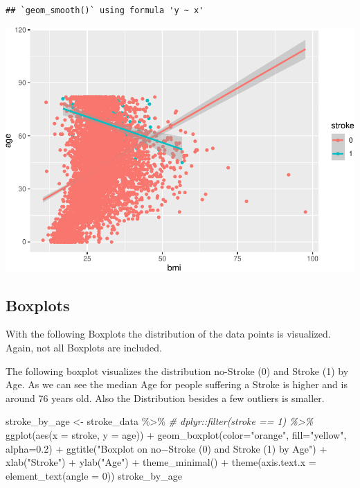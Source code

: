 \documentclass[
]{article}
\newenvironment{Shaded}{\begin{snugshade}}{\end{snugshade}}
\newcommand{\AttributeTok}[1]{\textcolor[rgb]{0.77,0.63,0.00}{#1}}
\newcommand{\CommentTok}[1]{\textcolor[rgb]{0.56,0.35,0.01}{\textit{#1}}}
\newcommand{\DecValTok}[1]{\textcolor[rgb]{0.00,0.00,0.81}{#1}}
\newcommand{\FloatTok}[1]{\textcolor[rgb]{0.00,0.00,0.81}{#1}}
\newcommand{\FunctionTok}[1]{\textcolor[rgb]{0.00,0.00,0.00}{#1}}
\newcommand{\NormalTok}[1]{#1}
\newcommand{\OtherTok}[1]{\textcolor[rgb]{0.56,0.35,0.01}{#1}}
\newcommand{\SpecialCharTok}[1]{\textcolor[rgb]{0.00,0.00,0.00}{#1}}
\newcommand{\StringTok}[1]{\textcolor[rgb]{0.31,0.60,0.02}{#1}}
\renewcommand{\=}[1]{\stackrel{#1}{=}}
\theoremstyle{definition}
\theoremstyle{remark}
\begin{document}
\begin{verbatim}
## `geom_smooth()` using formula 'y ~ x'
\end{verbatim}

\includegraphics{sioux_mach_learn_project_files/figure-latex/unnamed-chunk-15-1.pdf}

\hypertarget{boxplots}{%
\subsection{Boxplots}\label{boxplots}}

With the following Boxplots the distribution of the data points is visualized. Again, not all Boxplots are included.

The following boxplot visualizes the distribution no-Stroke (0) and Stroke (1) by Age. As we can see the median Age for people suffering a Stroke is higher and is around 76 years old. Also the Distribution besides a few outliers is smaller.

\begin{Shaded}
\begin{Highlighting}[]
\NormalTok{stroke\_by\_age }\OtherTok{\textless{}{-}}\NormalTok{ stroke\_data }\SpecialCharTok{\%\textgreater{}\%}
\CommentTok{\# dplyr::filter(stroke == 1) \%\textgreater{}\%}
 \FunctionTok{ggplot}\NormalTok{(}\FunctionTok{aes}\NormalTok{(}\AttributeTok{x =}\NormalTok{ stroke,}
            \AttributeTok{y =}\NormalTok{ age)) }\SpecialCharTok{+}
  \FunctionTok{geom\_boxplot}\NormalTok{(}\AttributeTok{color=}\StringTok{"orange"}\NormalTok{, }\AttributeTok{fill=}\StringTok{"yellow"}\NormalTok{, }\AttributeTok{alpha=}\FloatTok{0.2}\NormalTok{) }\SpecialCharTok{+}
  \FunctionTok{ggtitle}\NormalTok{(}\StringTok{"Boxplot on no−Stroke (0) and Stroke (1) by Age"}\NormalTok{) }\SpecialCharTok{+} 
  \FunctionTok{xlab}\NormalTok{(}\StringTok{"Stroke"}\NormalTok{) }\SpecialCharTok{+} \FunctionTok{ylab}\NormalTok{(}\StringTok{"Age"}\NormalTok{) }\SpecialCharTok{+}
  \FunctionTok{theme\_minimal}\NormalTok{() }\SpecialCharTok{+} \FunctionTok{theme}\NormalTok{(}\AttributeTok{axis.text.x =} \FunctionTok{element\_text}\NormalTok{(}\AttributeTok{angle =} \DecValTok{0}\NormalTok{)) }
\NormalTok{stroke\_by\_age }
\end{Highlighting}
\end{Shaded}
\end{document}
